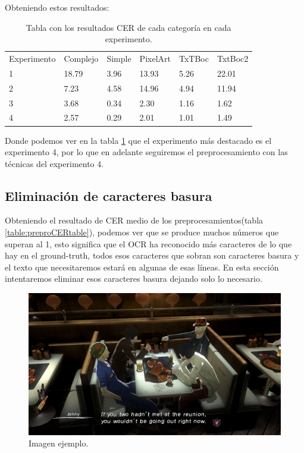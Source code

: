 Obteniendo estos resultados:
\begin{table}[H]
	\begin{tabular}{llllll}
		Experimento & Complejo & Simple & PixelArt & TxTBoc & TxtBoc2                      \\
		 1 & 18.79     & 3.96   & 13.93     & 5.26   & 22.01 \\
		 2 & 7.23     & 4.58   & 14.96     & 4.94   & 11.94 \\
		 3 & 3.68     & 0.34   & 2.30     & 1.16   & 1.62 \\
		 4 & 2.57     & 0.29   & 2.01     & 1.01   & 1.49
	\end{tabular}
	\caption{Tabla con los resultados CER de cada categoría en cada experimento.}
	\label{table:Prepro}
\end{table}
Donde podemos ver en la tabla \ref{table:Prepro} que el experimento más destacado es el experimento 4, por lo que en adelante seguiremos el preprocesamiento con las técnicas del experimento 4.
\subsection{Eliminación de caracteres basura}
Obteniendo el resultado de CER medio de los preprocesamientos(tabla \ref{table:preproCERtable}), podemos ver que se produce muchos números que superan al 1, esto significa que el OCR ha reconocido más caracteres de lo que hay en el ground-truth, todos esos caracteres que sobran son caracteres basura y el texto que necesitaremos estará en algunas de esas líneas. En esta sección intentaremos eliminar esos caracteres basura dejando solo lo necesario.
\begin{figure}[H]
	\centering
	\includegraphics[width = 1\textwidth]{Imagenes/Sample_Trash_Char.png}
	\caption{Imagen ejemplo.}
	\label{fig:Trash_Char}
\end{figure}

